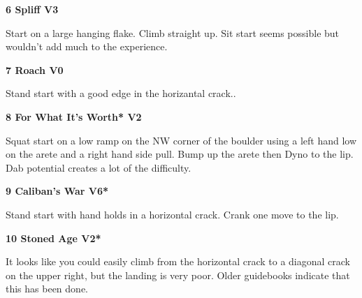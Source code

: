 \begin{multicols}{2}
					\begin{minipage}{\linewidth}	
					\label{rt:Spliff}
\colorbox{green!20}{
\parbox{0.95\textwidth}{
\textbf{
6 Spliff V3     \warn 
}
}
}

					\begin{adjustwidth}{0.5cm}{}				
					Start on a large hanging flake. Climb straight up. Sit start seems possible but wouldn't add much to the experience.
					\end{adjustwidth}
					\end{minipage}
					\begin{minipage}{\linewidth}	
					\label{rt:Roach}
\colorbox{green!20}{
\parbox{0.95\textwidth}{
\textbf{
7 Roach V0    
}
}
}

					\begin{adjustwidth}{0.5cm}{}				
					Stand start with a good edge in the horizantal crack..
					\end{adjustwidth}
					\end{minipage}
					\begin{minipage}{\linewidth}	
					\label{rt:For What It's Worth}
\colorbox{green!20}{
\parbox{0.95\textwidth}{
\textbf{
8 For What It's Worth* V2    
}
}
}

					\begin{adjustwidth}{0.5cm}{}				
					Squat start on a low ramp on the NW corner of the boulder using a left hand low on the arete and a right hand side pull. Bump up the arete then Dyno to the lip. Dab potential creates a lot of the difficulty.
					\end{adjustwidth}
					\end{minipage}

					\begin{minipage}{\linewidth}	
					\label{rt:Caliban's War}
\colorbox{RoyalBlue!20}{
\parbox{0.95\textwidth}{
\textbf{
9 Caliban's War V6*  
}
}
}

					\begin{adjustwidth}{0.5cm}{}				
					Stand start with hand holds in a horizontal crack. Crank one move to the lip.
					\end{adjustwidth}
					\end{minipage}
					\begin{minipage}{\linewidth}	
					\label{rt:Stoned Age}
\colorbox{green!20}{
\parbox{0.95\textwidth}{
\textbf{
10 Stoned Age V2*  
}
}
}

					\begin{adjustwidth}{0.5cm}{}				
					It looks like you could easily climb from the horizontal crack to a diagonal crack on the upper right, but the landing is very poor. Older guidebooks indicate that this has been done.
					\end{adjustwidth}
					\end{minipage}
\newpage

\end{multicols}
